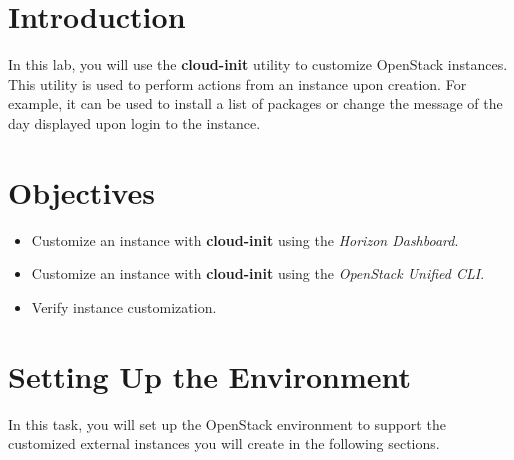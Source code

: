 \documentclass[letterpaper, 12pt]{article}
\begin{document}

\section*{Introduction}
\label{sec:introduction}
In this lab, you will use the \textbf{cloud-init} utility to customize OpenStack instances.
This utility is used to perform actions from an instance upon creation.
For example, it can be used to install a list of packages or change the message of the day displayed upon login to the instance.

\section*{Objectives}
\label{sec:objectives}
\begin{itemize}[itemsep=0pt]
    \item Customize an instance with \textbf{cloud-init} using the \textit{Horizon Dashboard}.
    \item Customize an instance with \textbf{cloud-init} using the \textit{OpenStack Unified CLI}.
    \item Verify instance customization.
\end{itemize}
\clearpage

\labsettings

\section{Setting Up the Environment}
\label{sec:settup_up_the_environment}
In this task, you will set up the OpenStack environment to support the customized external instances you will create in the following sections.
\end{document}
